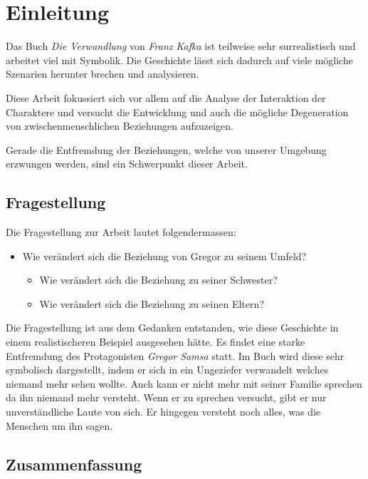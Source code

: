 \documentclass[12pt,a4paper,twoside,titlepage]{article}
\begin{document}
	\maketitle
	
	\tableofcontents
	
	\section{Einleitung}
	
	
	Das Buch \textit{Die Verwandlung} von \textit{Franz Kafka} ist teilweise sehr surrealistisch und arbeitet viel mit Symbolik. Die Geschichte lässt sich dadurch auf viele mögliche Szenarien herunter brechen und analysieren.
	
	Diese Arbeit fokussiert sich vor allem auf die Analyse der Interaktion der Charaktere und versucht die Entwicklung und auch die mögliche Degeneration von zwischenmenschlichen Beziehungen aufzuzeigen.
	
	Gerade die Entfremdung der Beziehungen, welche von unserer Umgebung erzwungen werden, sind ein Schwerpunkt dieser Arbeit.
	
	
	\subsection{Fragestellung}
	Die Fragestellung zur Arbeit lautet folgendermassen:
	\begin{itemize}
		\item Wie verändert sich die Beziehung von Gregor zu seinem Umfeld?
		\begin{itemize}
			\item Wie verändert sich die Beziehung zu seiner Schwester?
			\item Wie verändert sich die Beziehung zu seinen Eltern?
		\end{itemize}
	\end{itemize}
	
	Die Fragestellung ist aus dem Gedanken entstanden, wie diese Geschichte in einem realistischeren Beispiel ausgesehen hätte. Es findet eine starke Entfremdung des Protagonisten \textit{Gregor Samsa} statt. Im Buch wird diese sehr symbolisch dargestellt, indem er sich in ein Ungeziefer verwandelt welches niemand mehr sehen wollte. Auch kann er nicht mehr mit seiner Familie sprechen da ihn niemand mehr versteht. Wenn er zu sprechen versucht, gibt er nur unverständliche Laute von sich. Er hingegen versteht noch alles, was die Menschen um ihn sagen.
	
	\subsection{Zusammenfassung}
	
\end{document}
